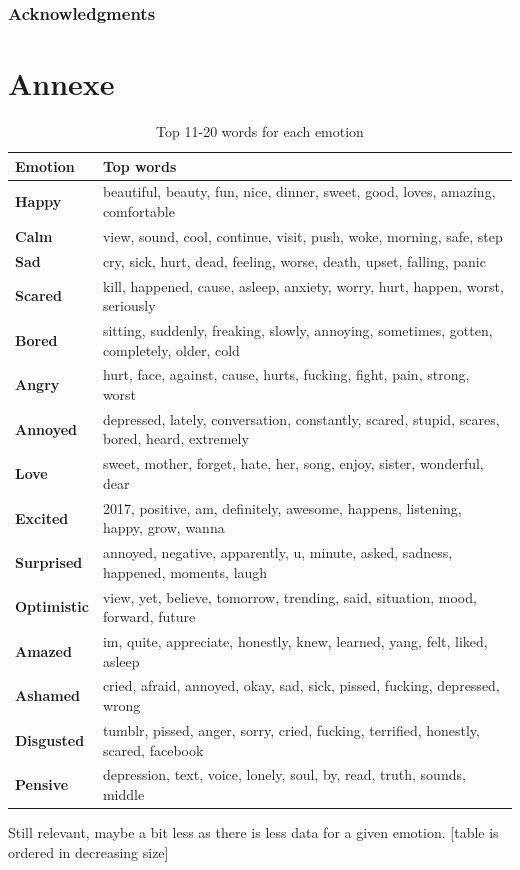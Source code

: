 \documentclass{article} %
\begin{document}
\subsubsection*{Acknowledgments}




\newpage
\section*{Annexe}

\begin{table}[H]
\caption{Top 11-20 words for each emotion}
\begin{center}
    \begin{tabular}{ l | l}
    Emotion & Top words\\
    \hline
    \textbf{Happy} & beautiful, beauty, fun, nice, dinner, sweet, good, loves, amazing, comfortable\\
\textbf{Calm} & view, sound, cool, continue, visit, push, woke, morning, safe, step\\
\textbf{Sad} & cry, sick, hurt, dead, feeling, worse, death, upset, falling, panic\\
\textbf{Scared} & kill, happened, cause, asleep, anxiety, worry, hurt, happen, worst, seriously\\
\textbf{Bored} & sitting, suddenly, freaking, slowly, annoying, sometimes, gotten, completely, older, cold\\
\textbf{Angry} & hurt, face, against, cause, hurts, fucking, fight, pain, strong, worst\\
\textbf{Annoyed} & depressed, lately, conversation, constantly, scared, stupid, scares, bored, heard, extremely\\
\textbf{Love} &  sweet, mother, forget, hate, her, song, enjoy, sister, wonderful, dear\\
\textbf{Excited} & 2017, positive, am, definitely, awesome, happens, listening, happy, grow, wanna\\
\textbf{Surprised} & annoyed, negative, apparently, u, minute, asked, sadness, happened, moments, laugh\\
\textbf{Optimistic} & view, yet, believe, tomorrow, trending, said, situation, mood, forward, future\\
\textbf{Amazed} & im, quite, appreciate, honestly, knew, learned, yang, felt, liked, asleep\\
\textbf{Ashamed} & cried, afraid, annoyed, okay, sad, sick, pissed, fucking, depressed, wrong\\
\textbf{Disgusted} & tumblr, pissed, anger, sorry, cried, fucking, terrified, honestly, scared, facebook\\
\textbf{Pensive} &  depression, text, voice, lonely, soul, by, read, truth, sounds, middle\\
    \end{tabular}
\end{center} 
\end{table}

Still relevant, maybe a bit less as there is less data for a given emotion. [table is ordered in decreasing size]
\end{document}
